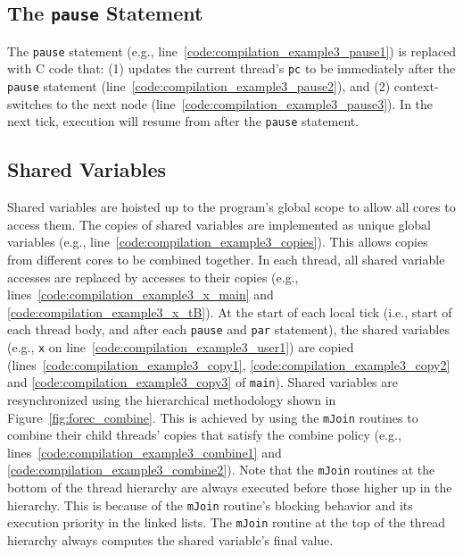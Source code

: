 \subsection{The \texttt{pause} Statement}
The \verb$pause$ statement (e.g., line~\ref{code:compilation_example3_pause1}) 
is replaced with C code that: (1) updates the current thread's \verb$pc$ 
to be immediately after the \verb$pause$ statement (line~\ref{code:compilation_example3_pause2}), 
and (2) context-switches to the next node (line~\ref{code:compilation_example3_pause3}). 
In the next tick, execution will resume from after the \verb$pause$
statement.


\subsection{Shared Variables}
Shared variables are hoisted up to the program's global 
scope to allow all cores to access them. The copies of 
shared variables are implemented as unique global variables 
(e.g., line~\ref{code:compilation_example3_copies}). 
This allows copies from different cores
to be combined together. In each thread, all shared variable 
accesses are replaced by accesses to their copies
(e.g., lines~\ref{code:compilation_example3_x_main} and 
\ref{code:compilation_example3_x_tB}). 
At the start of each local tick (i.e., start of each 
thread body, and after each \verb$pause$ 
and \verb$par$ statement), the shared
variables (e.g., \verb$x$ on line~\ref{code:compilation_example3_user1}) 
are copied (lines~\ref{code:compilation_example3_copy1}, 
\ref{code:compilation_example3_copy2} and 
\ref{code:compilation_example3_copy3} of \verb$main$).
Shared variables are resynchronized using the
hierarchical methodology shown in
Figure~\ref{fig:forec_combine}. This is achieved by using
the \verb$mJoin$ routines to combine their child threads'
copies that satisfy the combine policy (e.g., 
lines~\ref{code:compilation_example3_combine1} and 
\ref{code:compilation_example3_combine2}). Note that the
\verb$mJoin$ routines at the bottom of the thread hierarchy
are always executed before those higher up in the hierarchy.
This is because of the \verb$mJoin$ routine's blocking
behavior and its execution priority in the
linked lists. The \verb$mJoin$ routine at the top of
the thread hierarchy always computes the shared variable's
final value.


